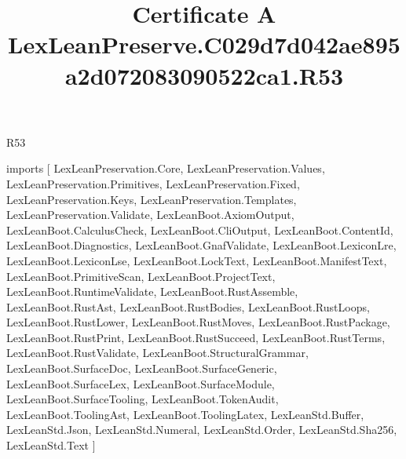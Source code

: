 \begin{lexlean}{R53}
\title{Certificate A LexLeanPreserve.C029d7d042ae895a2d072083090522ca1.R53}
\begin{coremodule}
imports [
  LexLeanPreservation.Core,
  LexLeanPreservation.Values,
  LexLeanPreservation.Primitives,
  LexLeanPreservation.Fixed,
  LexLeanPreservation.Keys,
  LexLeanPreservation.Templates,
  LexLeanPreservation.Validate,
  LexLeanBoot.AxiomOutput,
  LexLeanBoot.CalculusCheck,
  LexLeanBoot.CliOutput,
  LexLeanBoot.ContentId,
  LexLeanBoot.Diagnostics,
  LexLeanBoot.GnafValidate,
  LexLeanBoot.LexiconLre,
  LexLeanBoot.LexiconLse,
  LexLeanBoot.LockText,
  LexLeanBoot.ManifestText,
  LexLeanBoot.PrimitiveScan,
  LexLeanBoot.ProjectText,
  LexLeanBoot.RuntimeValidate,
  LexLeanBoot.RustAssemble,
  LexLeanBoot.RustAst,
  LexLeanBoot.RustBodies,
  LexLeanBoot.RustLoops,
  LexLeanBoot.RustLower,
  LexLeanBoot.RustMoves,
  LexLeanBoot.RustPackage,
  LexLeanBoot.RustPrint,
  LexLeanBoot.RustSucceed,
  LexLeanBoot.RustTerms,
  LexLeanBoot.RustValidate,
  LexLeanBoot.StructuralGrammar,
  LexLeanBoot.SurfaceDoc,
  LexLeanBoot.SurfaceGeneric,
  LexLeanBoot.SurfaceLex,
  LexLeanBoot.SurfaceModule,
  LexLeanBoot.SurfaceTooling,
  LexLeanBoot.TokenAudit,
  LexLeanBoot.ToolingAst,
  LexLeanBoot.ToolingLatex,
  LexLeanStd.Buffer,
  LexLeanStd.Json,
  LexLeanStd.Numeral,
  LexLeanStd.Order,
  LexLeanStd.Sha256,
  LexLeanStd.Text
]


\end{coremodule}
\end{lexlean}
